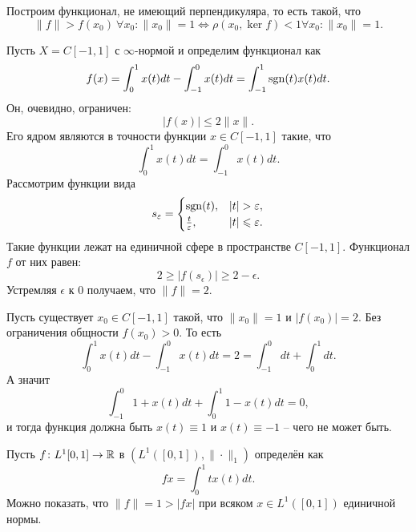 \begin{example}
    Построим функционал, не имеющий перпендикуляра, то есть такой, что
    \[
        \|f\| > f(x_0) \ \forall x_0\colon  \|x_0\| = 1 \Longleftrightarrow \rho(x_0, \ker f) < 1 \forall x_0\colon \|x_0\| = 1.
    \]

    Пусть $X = C[-1, 1]$ с $\infty$-нормой и определим функционал как
    \[
        f(x) = \int_0^1 x(t) dt - \int_{-1}^0 x(t) dt = \int_{-1}^{1} \operatorname{sgn}(t)x(t)dt.
    \]
    Он, очевидно, ограничен:
    \[
        |f(x)| \leq 2\|x\|.
    \]
    Его ядром являются в точности функции $x \in C[-1, 1]$ такие, что
    \[
        \int_0^{1} x(t) dt = \int_{-1}^0 x(t)dt.
    \]
    Рассмотрим функции вида
    \[
        s_{\varepsilon} =
        \begin{cases}
            \operatorname{sgn}(t), & |t| > \varepsilon, \\
            \frac{t}{\varepsilon}, & |t| \leqslant \varepsilon.
        \end{cases}
    \]
    Такие функции лежат на единичной сфере в пространстве $C[-1, 1]$.
    Функционал $f$ от них равен:
    \[
        2 \geq |f(s_\epsilon)| \geq 2 - \epsilon.
    \]
    Устремляя $\epsilon$ к 0 получаем, что $\|f\| = 2$.

    Пусть существует $x_0 \in C[-1, 1]$ такой, что $\|x_0\| = 1$ и $|f(x_0)| = 2$.
    Без ограничения общности $f(x_0) > 0$.
    То есть
    \[
        \int_{0}^{1} x(t)dt - \int_{-1}^{0} x(t)dt = 2 = \int_{-1}^0 dt + \int_0^1 dt.
    \]
    А значит
    \[
        \int_{-1}^0 1 + x(t)dt + \int_0^1 1 - x(t)dt = 0,
    \]
    и тогда функция должна быть $x(t) \equiv 1$ и $x(t) \equiv -1$ -- чего не может быть.
\end{example}
\begin{example}
    Пусть $f\colon L^1[0, 1] \to \mathbb{R}$ в $(L^1([0, 1]), \|\cdot\|_1)$ определён как
    \[
        fx = \int_0^1 t x(t)dt.
    \]
    Можно показать, что $\|f\| = 1 > |fx|$ при всяком $x \in L^1([0, 1])$ единичной нормы.
\end{example}

